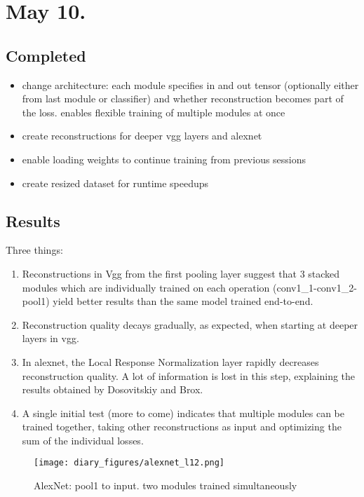 \documentclass{article}
\begin{document}
\section*{May 10.}

\subsection*{Completed}
\begin{itemize}
    \item change architecture: each module specifies in and out tensor (optionally either from last module or classifier) and whether reconstruction becomes part of the loss. enables flexible training of multiple modules at once
    \item  create reconstructions for deeper vgg layers and alexnet
    \item enable loading weights to continue training from previous sessions
    \item create resized dataset for runtime speedups
\end{itemize}

\subsection*{Results}
Three things:
\begin{enumerate}
    \item Reconstructions in Vgg from the first pooling layer suggest that 3 stacked modules which are individually trained on each operation (conv1\_1-conv1\_2-pool1) yield better results than the same model trained end-to-end.
    \item Reconstruction quality decays gradually, as expected, when starting at deeper layers in vgg.
    \item In alexnet, the Local Response Normalization layer rapidly decreases reconstruction quality. A lot of information is lost in this step, explaining the results obtained by Dosovitskiy and Brox.
    \item A single initial test (more to come) indicates that multiple modules can be trained together, taking other reconstructions as input and optimizing the sum of the individual losses.
\end{enumerate}

\FloatBarrier

\begin{figure}
    \centering
    \texttt{[image: diary\_figures/alexnet\_l12.png]}
    \caption{AlexNet: pool1 to input. two modules trained simultaneously}
    \label{fig:may10_a_l12}
\end{figure}
\end{document}
